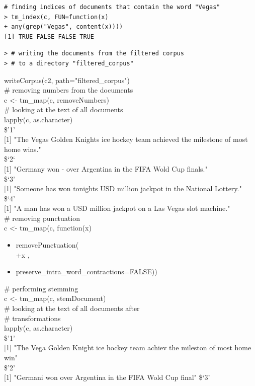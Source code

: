 \documentclass[10pt]{book}
\begin{document}
\begin{verbatim}
# finding indices of documents that contain the word "Vegas"
> tm_index(c, FUN=function(x)
+ any(grep("Vegas", content(x))))
[1] TRUE FALSE FALSE TRUE
\end{verbatim}

\begin{verbatim}
> # writing the documents from the filtered corpus
> # to a directory "filtered_corpus"
\end{verbatim}

\begin{displayquote}
writeCorpus(c2, path="filtered\_corpus")\\
\# removing numbers from the documents\\
c <- tm\_map(c, removeNumbers)\\
\# looking at the text of all documents\\
lapply(c, as.character)\\
\$'1'\\[0pt]
[1] "The Vegas Golden Knights ice hockey team achieved the milestone of most home wins."\\
\$‘2‘\\[0pt]
[1] "Germany won - over Argentina in the FIFA Wold Cup finals."\\
\$‘3’\\[0pt]
[1] "Someone has won tonights USD million jackpot in the National Lottery."\\
\$‘4’\\[0pt]
[1] "A man has won a USD million jackpot on a Las Vegas slot machine."\\
\# removing punctuation\\
c <- tm\_map(c, function(x)
\end{displayquote}

\begin{itemize}
  \item removePunctuation(\\
+x ,
  \item preserve\_intra\_word\_contractions=FALSE))
\end{itemize}

\begin{displayquote}
\# performing stemming\\
c <- tm\_map(c, stemDocument)\\
\# looking at the text of all documents after\\
\# transformations\\
lapply(c, as.character)\\
\$'1'\\[0pt]
[1] "The Vega Golden Knight ice hockey team achiev the mileston of most home win"\\
\$'2'\\[0pt]
[1] "Germani won over Argentina in the FIFA Wold Cup final" \$‘3’
\end{displayquote}
\end{document}
